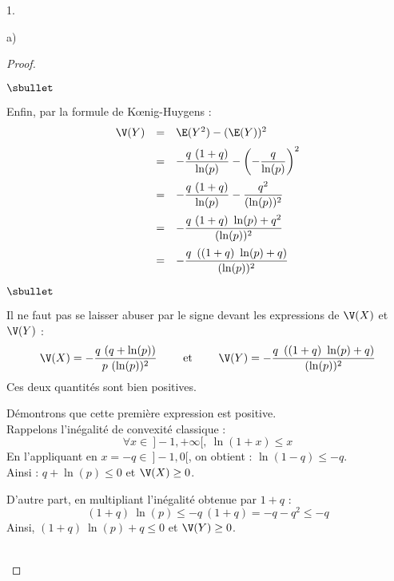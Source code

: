 \documentclass[11pt]{article}%
\begin{document}
\begin{noliste}{1.}
\begin{noliste}{a)}
\begin{proof}
\begin{noliste}{$\sbullet$}
      \item Enfin, par la formule de K\oe{}nig-Huygens :
        \[
        \begin{array}{rcl}
          \V(Y) & = & \E(Y^2) - (\E(Y))^2 
          \\[.2cm]
          & = & - \dfrac{q \ (1+q)}{\ln(p)} - \left( -
            \dfrac{q}{\ln(p)} \right)^2
          \\[.4cm]
          & = & - \dfrac{q \ (1+q)}{\ln(p)} - \dfrac{q^2}{(\ln(p))^2}
          \\[.4cm]
          & = & - \dfrac{q \ (1+q) \ \ln(p) + q^2}{(\ln(p))^2}
          \\[.4cm]
          & = & - \dfrac{q \ \left( (1+q) \ \ln(p) + q \right)}{(\ln(p))^2}
        \end{array}
        \]
      \end{noliste}
      \begin{remark}%
        \begin{noliste}{$\sbullet$}
        \item Il ne faut pas se laisser abuser par le signe devant les
          expressions de $\V(X)$ et $\V(Y)$ :
          \[
          \V(X) = - \dfrac{q \ (q + \ln(p))}{p \ (\ln(p))^2} \qquad
          \text{ et } \qquad \V(Y) = - \dfrac{q \ \left( (1+q) \
              \ln(p) + q \right)}{(\ln(p))^2}
          \]
          Ces deux quantités sont bien positives.
        \item Démontrons que cette première expression est positive.\\
          Rappelons l'inégalité de convexité classique :
          \[
          \forall x \in \ ]-1, +\infty[, \ \ln(1+x) \leq x
          \]
          En l'appliquant en $x = -q \in \ ]-1, 0[$, on obtient :
          $\ln(1-q) \leq -q$.\\
          Ainsi : $q + \ln(p) \leq 0$ et $\V(X) \geq 0$.

        \item D'autre part, en multipliant l'inégalité obtenue par
          $1+q$ :
          \[
          (1+q) \ \ln(p) \leq -q \ (1+q) = -q - q^2 \leq -q
          \]
          Ainsi, $(1+q) \ \ln(p) + q \leq 0$ et $\V(Y) \geq 0$.
        \end{noliste}
      \end{remark}~\\[-1.2cm]
    \end{proof}
  \end{noliste}
\end{noliste}
\end{document}
